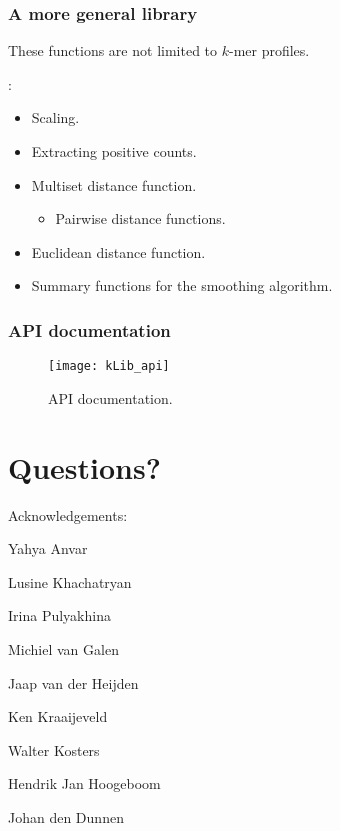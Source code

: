 \documentclass[slidestop]{beamer}
\begin{document}
\begin{frame}
  \frametitle{A more general library}

  These functions are not limited to $k$-mer profiles.
  \bigskip

  :
  \begin{itemize}
    \item Scaling.
    \item Extracting positive counts.
    \item Multiset distance function.
    \begin{itemize}
      \item Pairwise distance functions.
    \end{itemize}
    \item Euclidean distance function.
    \item Summary functions for the smoothing algorithm.
  \end{itemize}
\end{frame}

\begin{frame}
  \frametitle{API documentation}

  \begin{figure}[]
    \begin{center}
      \texttt{[image: kLib\_api]}
    \end{center}
    \caption{API documentation.}
    \label{}
  \end{figure}
\end{frame}

\section{Questions?}
\lastpagetemplate
\begin{fframe}
  \begin{center}
    Acknowledgements:
    \bigskip
    \bigskip

    Yahya Anvar

    Lusine Khachatryan

    Irina Pulyakhina

    Michiel van Galen

    Jaap van der Heijden

    Ken Kraaijeveld

    Walter Kosters

    Hendrik Jan Hoogeboom

    Johan den Dunnen
  \end{center}

  \vfill
\end{fframe}
\end{document}
